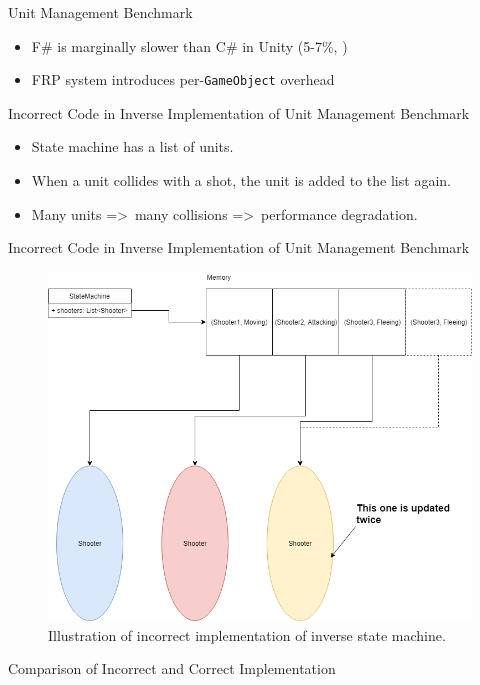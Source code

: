 \begin{frame}{\secname}{\subsecname}
	Unit Management Benchmark
	\begin{itemize}
		\item F\# is marginally slower than C\# in Unity (5-7\%, \cite{maggiore2012formal,bolhuis2019gameplay})
		\item FRP system introduces per-\texttt{GameObject} overhead
	\end{itemize}
\end{frame}

\begin{frame}{\secname}{\subsecname}
	Incorrect Code in Inverse Implementation of Unit Management Benchmark
	\begin{itemize}
		\item State machine has a list of units.
		\item When a unit collides with a shot, the unit is added to the list again.
		\item Many units =\textgreater\ many collisions =\textgreater\ performance degradation.
	\end{itemize}
\end{frame}

\begin{frame}{\secname}{\subsecname}
	Incorrect Code in Inverse Implementation of Unit Management Benchmark
	\begin{figure}[h!]
		\centering
		\includegraphics[width=.7\textwidth]{pictures/statemachine.png}
		\caption{Illustration of incorrect implementation of inverse state machine.}
		\label{fig:incorrect:statemachine}
	\end{figure}
\end{frame}

\begin{frame}[fragile]{\secname}{\subsecname}
	Comparison of Incorrect and Correct Implementation
\end{frame}

